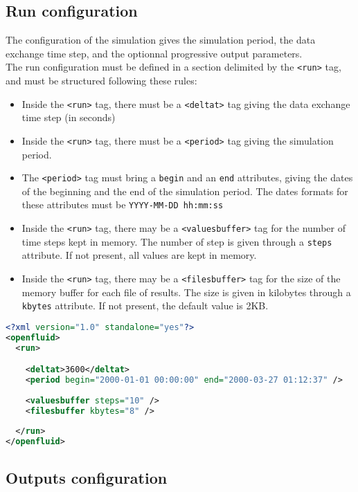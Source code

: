 \subsection{Run configuration}

The configuration of the simulation gives the simulation period, the data
exchange time step, and the optionnal progressive output parameters.\\
\noindent The run configuration must be defined in a section delimited by the
\texttt{<run>} tag, and must be structured following these rules:
\begin{itemize}
  \item Inside the \texttt{<run>} tag, there must be a \texttt{<deltat>} tag
  giving the data exchange time step (in seconds)
  \item Inside the \texttt{<run>} tag, there must be a \texttt{<period>} tag
  giving the simulation period.
  \item The \texttt{<period>} tag must bring a \texttt{begin} and an
  \texttt{end} attributes, giving the dates of the beginning and the end of the
  simulation period. The dates formats for these attributes must be
  \texttt{YYYY-MM-DD hh:mm:ss}
  \item Inside the \texttt{<run>} tag, there may be a \texttt{<valuesbuffer>}
  tag for the number of time steps kept in memory. The number of step is given
  through a \texttt{steps} attribute. If not present, all values are kept in memory.
  \item Inside the \texttt{<run>} tag, there may be a \texttt{<filesbuffer>}
  tag for the size of the memory buffer for each file of results. The size is given
  in kilobytes through a \texttt{kbytes} attribute. If not present, the default value 
  is 2KB.

\end{itemize}

\begin{lstlisting}[language=xml,title=\footnotesize\textit{example}]
<?xml version="1.0" standalone="yes"?>
<openfluid>
  <run>

    <deltat>3600</deltat>
    <period begin="2000-01-01 00:00:00" end="2000-03-27 01:12:37" />
    
    <valuesbuffer steps="10" />
    <filesbuffer kbytes="8" />
    
  </run>
</openfluid>
\end{lstlisting}

\bigskip

\subsection{Outputs configuration}

